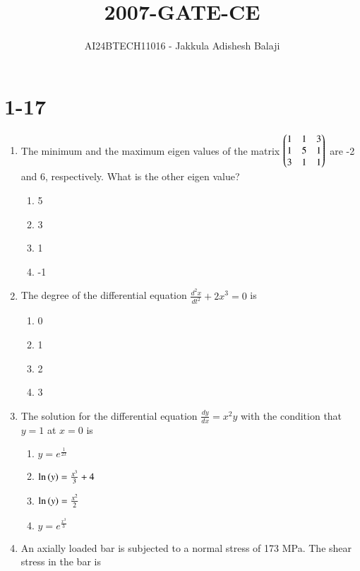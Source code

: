 \documentclass[journal]{IEEEtran}
\begin{document}

\title{2007-GATE-CE}
\author{AI24BTECH11016 - Jakkula Adishesh Balaji}
{\let\newpage\relax\maketitle}

\renewcommand{\thefigure}{\theenumi}
\renewcommand{\thetable}{\theenumi}
\setlength{\intextsep}{10pt} %
\section{1-17}
\begin{enumerate}
	\item
	The minimum and the maximum eigen values of the matrix $\begin{pmatrix}1 & 1 & 3 \\ 1 & 5 & 1 \\ 3 & 1 & 1\end{pmatrix}$ are -2 and 6, respectively. What is the other eigen value?
		\begin{enumerate}
			\item 5
			\item 3
			\item 1
			\item -1
		\end{enumerate}
	\item
	The degree of the differential equation $\frac{d^{2}x}{d{t}^2} + 2x^3 = 0$ is
		\begin{enumerate}
			\item 0
			\item 1
			\item 2
			\item 3
		\end{enumerate}
	\item
	The solution for the differential equation $\frac{dy}{dx} = x^{2}y$ with the condition that $y=1$ at $x=0$ is 
		\begin{enumerate}
			\item $y=e^{\frac{1}{2x}}$
			\item $\ln\left(y\right) = \frac{x^3}{3} + 4$
			\item $\ln\left(y\right) = \frac{x^2}{2}$
			\item $y = e^{\frac{x^3}{3}}$
		\end{enumerate}
	\item
	An axially loaded bar is subjected to a normal stress of 173 MPa. The shear stress in the bar is
		\begin{enumerate}

\end{enumerate}
\end{enumerate}
\end{document}
